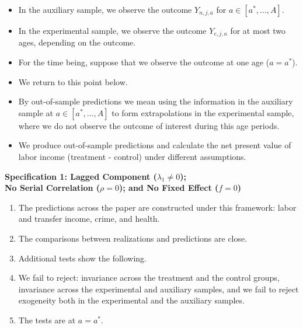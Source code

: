 \documentclass[static]{JJH-Beamer}
\begin{document}
\begin{frame}
 \addtocounter{framenumber}{-1}

\begin{itemize}
\item In the auxiliary sample, we observe the outcome $Y_{n,j,a}$ for $a \in [a^*, \ldots, A]$.
\item In the experimental sample, we observe the outcome $Y_{e,j,a}$ for at most two ages, depending on the outcome.
\item For the time being, suppose that we observe the outcome at one age ($a = a^*$).
\item We return to this point below.
\item By out-of-sample predictions we mean using the information in the auxiliary sample at  $a \in [a^*, \ldots, A]$ to form extrapolations in the experimental sample, where we do not observe the outcome of interest during this age periods.
\item We produce out-of-sample predictions and calculate the net present value of labor income (treatment - control) under different assumptions.
\end{itemize}

\end{frame}

\begin{frame}
 \addtocounter{framenumber}{-1}

\textbf{Specification 1: Lagged Component ($\lambda_{1} \neq 0$); \\ No Serial Correlation ($\rho = 0$); and No Fixed Effect ($f = 0$)}

\begin{enumerate}
\item The predictions across the paper are constructed under this framework: labor and transfer income, crime, and health.
\item The comparisons between realizations and predictions are close.
\item Additional tests show the following.
\item We fail to reject: invariance across the treatment and the control groups, invariance across the experimental and auxiliary samples, and we fail to reject exogeneity both in the experimental and the auxiliary samples.
\item The tests are at $a = a^*$.
\end{enumerate}

\end{frame}
\end{document}
